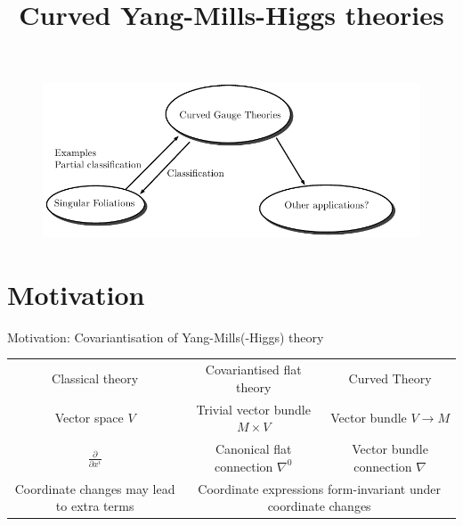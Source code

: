 \documentclass[
aspectratio=3218, 
10pt
]{beamer}
\title{Curved Yang-Mills-Higgs theories}
\subtitle{}
\author{Simon-Raphael Fischer, \textit{based on joint works with Camille Laurent-Gengoux, and with Mehran Jalali Farahani, Hyungrok Kim (\begin{CJK*}{UTF8}{bkai}金炯錄\end{CJK*}), Christian Sämann}}
\institute{
\begin{figure}
	\centering
		\texttt{[image: Logo\_Uni\_Göttingen\_2022.png]}
	\label{fig:NCTS}
\end{figure}
\begin{center}
\end{center}
}
\date{}
\theoremstyle{plain}
\theoremstyle{remark}
\begin{document}
\begin{frame}
\thispagestyle{empty}
\titlepage
\end{frame} 


{
\begin{frame}
\thispagestyle{empty}
\begin{figure}[htbp]
	\centering
		\includegraphics[width=1\textwidth]{Research circles I.pdf}
\end{figure}
\end{frame} 
}

\section{Motivation}



\begin{frame}{Motivation: Covariantisation of Yang-Mills(-Higgs) theory}
{\renewcommand{\arraystretch}{2}
\begin{table}[h!]
		\begin{tabularx}{\textwidth}{c c c}
			\rowcolor{gray}
			Classical theory & Covariantised flat theory & Curved Theory \\
			Vector space $V$ & Trivial vector bundle $M \times V$ & Vector bundle $V \to M$ \\
			\rowcolor{Gray}
			$\frac{\partial}{\partial x^i}$ & Canonical flat connection $\nabla^0$ & Vector bundle connection $\nabla$ \\ 
			\multicolumn{1}{X}{Coordinate changes may lead to extra terms} & 
			\multicolumn{2}{c}{Coordinate expressions form-invariant under coordinate changes}
		\end{tabularx}
\end{table}}
\vspace{-30pt}
 \end{frame}
\end{document}
